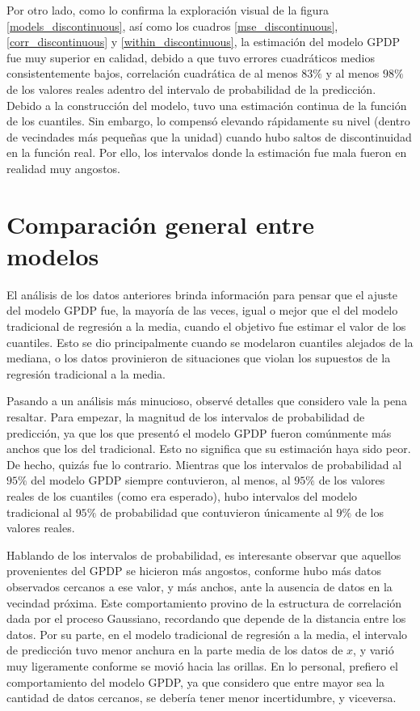 Por otro lado, como lo confirma la exploraci\'on visual de la figura \ref{models_discontinuous}, as\'i como los cuadros \ref{mse_discontinuous}, \ref{corr_discontinuous} y \ref{within_discontinuous}, la estimaci\'on del modelo GPDP fue muy superior en calidad, debido a que tuvo errores cuadr\'aticos medios consistentemente bajos, correlaci\'on cuadr\'atica de al menos $83\%$ y al menos $98\%$ de los valores reales adentro del intervalo de probabilidad de la predicci\'on. Debido a la construcci\'on del modelo, tuvo una estimaci\'on continua de la funci\'on de los cuantiles. Sin embargo, lo compens\'o elevando r\'apidamente su nivel (dentro de vecindades m\'as pequeñas que la unidad) cuando hubo saltos de discontinuidad en la funci\'on real. Por ello, los intervalos donde la estimaci\'on fue mala fueron en realidad muy angostos.

\section{Comparaci\'on general entre modelos}
\label{models_comp}

El an\'alisis de los datos anteriores brinda informaci\'on para pensar que el ajuste del modelo GPDP fue, la mayor\'ia de las veces, igual o mejor que el del modelo tradicional de regresi\'on a la media, cuando el objetivo fue estimar el valor de los cuantiles. Esto se dio principalmente cuando se modelaron cuantiles alejados de la mediana, o los datos provinieron de situaciones que violan los supuestos de la regresi\'on tradicional a la media. 

Pasando a un an\'alisis m\'as minucioso, observ\'e detalles que considero vale la pena resaltar. Para empezar, la magnitud de los intervalos de probabilidad de predicci\'on, ya que los que present\'o el modelo GPDP fueron com\'unmente m\'as anchos que los del tradicional. Esto no significa que su estimaci\'on haya sido peor. De hecho, quiz\'as fue lo contrario. Mientras que los intervalos de probabilidad al $95\%$ del modelo GPDP siempre contuvieron, al menos, al $95\%$ de los valores reales de los cuantiles (como era esperado), hubo intervalos del modelo tradicional al $95\%$ de probabilidad que contuvieron \'unicamente al $9\%$ de los valores reales.

Hablando de los intervalos de probabilidad, es interesante observar que aquellos provenientes del GPDP se hicieron m\'as angostos, conforme hubo m\'as datos observados cercanos a ese valor, y m\'as anchos, ante la ausencia de datos en la vecindad pr\'oxima. Este comportamiento provino de la estructura de correlaci\'on dada por el proceso Gaussiano, recordando que depende de la distancia entre los datos. Por su parte, en el modelo tradicional de regresi\'on a la media, el intervalo de predicci\'on tuvo menor anchura en la parte media de los datos de $x$, y vari\'o muy ligeramente conforme se movi\'o hacia las orillas. En lo personal, prefiero el comportamiento del modelo GPDP, ya que considero que entre mayor sea la cantidad de datos cercanos, se deber\'ia tener menor incertidumbre, y viceversa.


